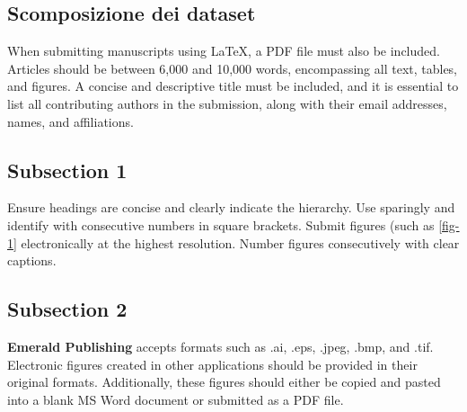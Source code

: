 \subsection{Scomposizione dei dataset}





When submitting manuscripts using \LaTeX, a PDF file must also be included. 
Articles should be between 6,000 and 10,000 words, encompassing all text, tables, and figures. 
A concise and descriptive title must be included, and it is essential to list all contributing authors in the submission, along with their email addresses, names, and affiliations.

\subsection{Subsection 1}

Ensure headings are concise and clearly indicate the hierarchy. 
Use sparingly and identify with consecutive numbers in square brackets.
Submit figures (such as \cref{fig-1} electronically at the highest resolution. Number figures consecutively with clear captions.



\subsection{Subsection 2}
\textbf{Emerald Publishing} accepts formats such as .ai, .eps, .jpeg, .bmp, and .tif. Electronic figures created in other applications should be provided in their original formats. 
Additionally, these figures should either be copied and pasted into a blank MS Word document or submitted as a PDF file.